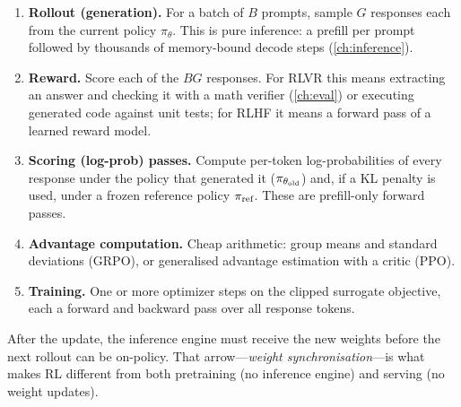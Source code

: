 \begin{enumerate}
\item \textbf{Rollout (generation).} For a batch of $B$ prompts, sample $G$ responses each
  from the current policy $\pi_{\theta}$. This is pure inference: a prefill per prompt
  followed by thousands of memory-bound decode steps (\cref{ch:inference}).
\item \textbf{Reward.} Score each of the $BG$ responses. For RLVR this means extracting an
  answer and checking it with a math verifier (\cref{ch:eval}) or executing generated code
  against unit tests; for RLHF it means a forward pass of a learned reward model.
\item \textbf{Scoring (log-prob) passes.} Compute per-token log-probabilities of every
  response under the policy that generated it ($\pi_{\theta_{\text{old}}}$) and, if a KL penalty is used,
  under a frozen reference policy $\pi_{\text{ref}}$. These are prefill-only forward passes.
\item \textbf{Advantage computation.} Cheap arithmetic: group means and standard
  deviations (GRPO), or generalised advantage estimation with a critic (PPO).
\item \textbf{Training.} One or more optimizer steps on the clipped surrogate objective,
  each a forward and backward pass over all response tokens.
\end{enumerate}
After the update, the inference engine must receive the new weights before the next rollout
can be on-policy. That arrow---\emph{weight synchronisation}---is what makes RL different
from both pretraining (no inference engine) and serving (no weight updates).

